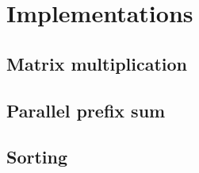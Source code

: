 \section{Implementations}

\subsection{Matrix multiplication}


\subsection{Parallel prefix sum}


\subsection{Sorting}


